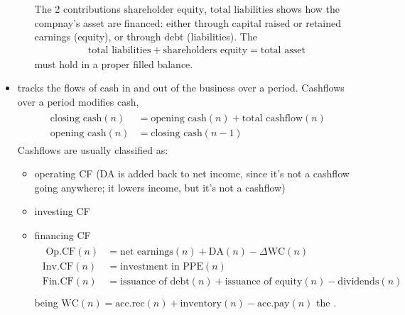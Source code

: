 \documentclass[letterpaper,10pt,english]{jupyterBook}
\begin{document}
\begin{itemize}
\begin{itemize}
\sphinxAtStartPar
The 2 contributions \(\text{shareholder equity}\), \(\text{total liabilities}\) shows how the  compnay’s asset are financed: either through capital raised or retained earnings (equity), or through debt (liabilities). The 
\begin{equation*}
\begin{split}\text{total liabilities} + \text{shareholders equity} = \text{total asset}\end{split}
\end{equation*}
\sphinxAtStartPar
must hold in a proper filled balance.

\end{itemize}

\item {} 
\sphinxAtStartPar
{} tracks the flows of cash in and out of the business over a period. Cashflows over a period modifies cash,
\begin{equation*}
\begin{split}\begin{aligned}
    \text{closing cash}(n) & = \text{opening cash}(n) + \text{total cashflow}(n) \\
    \text{opening cash}(n) & = \text{closing cash}(n-1)
  \end{aligned}\end{split}
\end{equation*}
\sphinxAtStartPar
Cashflows are usually classified as:
\begin{itemize}
\item {} 
\sphinxAtStartPar
operating CF (DA is added back to net income, since it’s not a cashflow going anywhere; it lowers income, but it’s not a cashflow)

\item {} 
\sphinxAtStartPar
investing CF

\item {} 
\sphinxAtStartPar
financing CF
\begin{equation*}
\begin{split}\begin{aligned}
      \text{ Op.CF}(n) & = \text{net earnings}(n) + \text{DA}(n) - \Delta \text{WC}(n) \\
      \text{Inv.CF}(n) & = \text{investment in PPE}(n) \\
      \text{Fin.CF}(n) & = \text{issuance of debt}(n) + \text{issuance of equity}(n) - \text{dividends}(n) \\
    \end{aligned}\end{split}
\end{equation*}
\sphinxAtStartPar
being \(\text{WC}(n) = \text{acc.rec}(n) + \text{inventory}(n) - \text{acc.pay}(n)\) the .

\end{itemize}

\end{itemize}
\end{document}

